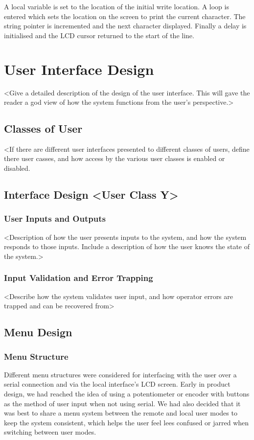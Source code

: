 \documentclass[]{report}
\begin{document}
A local variable is set to the location of the initial write location. A loop is entered which sets the location on the screen to print the current character. The string pointer is incremented and the next character displayed. Finally a delay is initialised and the LCD cursor returned to the start of the line.

\chapter{User Interface Design}
<Give a detailed description of the design of the user interface. This will gave the reader a god view of how the system functions from the user's perspective.>

\section{Classes of User}
<If there are different user interfaces presented to different classes of users, define there user casses, and how access by the various user classes is enabled or disabled.

\section{Interface Design <User Class Y>}
\subsection{User Inputs and Outputs}
<Description of how the user presents inputs to the system, and how the system responds to those inputs. Include a description of how the user knows the state of the system.>

\subsection{Input Validation and Error Trapping}
<Describe how the system validates user input, and how operator errors are trapped and can be recovered from>

\section{Menu Design}
\subsection{Menu Structure}
Different menu structures were considered for interfacing with the user over a serial connection and via the local interface's LCD screen. Early in product design, we had reached the idea of using a potentiometer or encoder with buttons as the method of user input when not using serial. We had also decided that it was best to share a menu system between the remote and local user modes to keep the system consistent, which helps the user feel lees confused or jarred when switching between user modes. 
\end{document}
